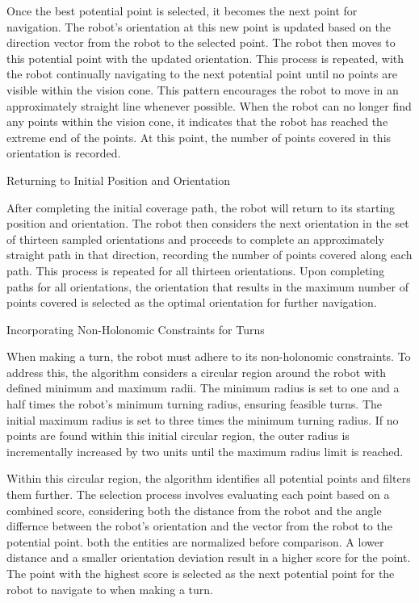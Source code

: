 \vspace*{6mm}  

Once the best potential point is selected, it becomes the next point for navigation. The robot's orientation at this new point is updated based on the direction vector from the robot to the selected point. The robot then moves to this potential point with the updated orientation. This process is repeated, with the robot continually navigating to the next potential point until no points are visible within the vision cone. This pattern encourages the robot to move in an approximately straight line whenever possible. When the robot can no longer find any points within the vision cone, it indicates that the robot has reached the extreme end of the points. At this point, the number of points covered in this orientation is recorded.

\vspace*{6mm}  

Returning to Initial Position and Orientation

After completing the initial coverage path, the robot will return to its starting position and orientation. The robot then considers the next orientation in the set of thirteen sampled orientations and proceeds to complete an approximately straight path in that direction, recording the number of points covered along each path. This process is repeated for all thirteen orientations. Upon completing paths for all orientations, the orientation that results in the maximum number of points covered is selected as the optimal orientation for further navigation.
\vspace*{6mm}  

Incorporating Non-Holonomic Constraints for Turns
\vspace*{6mm}  

When making a turn, the robot must adhere to its non-holonomic constraints. To address this, the algorithm considers a circular region around the robot with defined minimum and maximum radii. The minimum radius is set to one and a half times the robot's minimum turning radius, ensuring feasible turns. The initial maximum radius is set to three times the minimum turning radius. If no points are found within this initial circular region, the outer radius is incrementally increased by two units until the maximum radius limit is reached.
\vspace*{6mm}  

Within this circular region, the algorithm identifies all potential points and filters them further. The selection process involves evaluating each point based on a combined score, considering both the distance from the robot and the angle differnce between the robot's orientation and the vector from the robot to the potential point. both the entities are normalized before comparison. A lower distance and a smaller orientation deviation result in a higher score for the point. The point with the highest score is selected as the next potential point for the robot to navigate to when making a turn.
\vspace*{6mm}  

